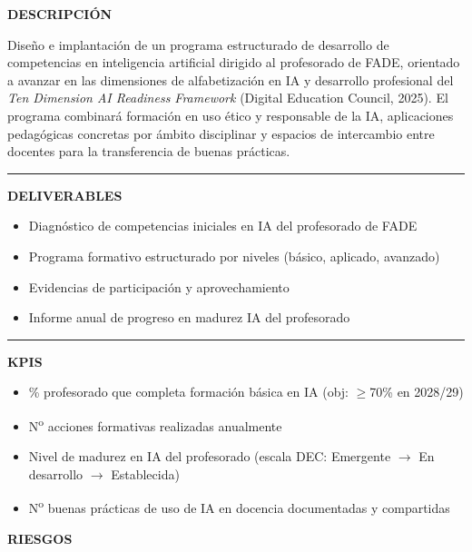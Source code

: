 \documentclass[11pt,a4paper]{scrreprt}
\newcommand{\fieldlabel}[1]{%
  {\footnotesize\sffamily\bfseries\color{mutedcolor}\MakeUppercase{#1}}\par\nopagebreak[4]
}
\newcommand{\fieldsep}{\vspace{3pt}\noindent\textcolor{bordercolor}{\rule{\linewidth}{0.4pt}}\vspace{3pt}\par}
\begin{document}
\begin{tcolorbox}[pabox={aacolor}{PA4.3 \enspace\textbullet\enspace Desarrollo de la alfabetización en IA del profesorado}]

\fieldlabel{Descripci\'on}
{\small Diseño e implantación de un programa estructurado de desarrollo de competencias en inteligencia artificial dirigido al profesorado de FADE, orientado a avanzar en las dimensiones de alfabetización en IA y desarrollo profesional del \textit{Ten Dimension AI Readiness Framework} (Digital Education Council, 2025). El programa combinará formación en uso ético y responsable de la IA, aplicaciones pedagógicas concretas por ámbito disciplinar y espacios de intercambio entre docentes para la transferencia de buenas prácticas.}\par
\fieldsep
\fieldlabel{Deliverables}
{\small \begin{itemize}[noitemsep,topsep=2pt]
\item Diagnóstico de competencias iniciales en IA del profesorado de FADE
\item Programa formativo estructurado por niveles (básico, aplicado, avanzado)
\item Evidencias de participación y aprovechamiento
\item Informe anual de progreso en madurez IA del profesorado
\end{itemize}}\par
\fieldsep
\fieldlabel{KPIs}
{\small \begin{itemize}[noitemsep,topsep=2pt]
\item \% profesorado que completa formación básica en IA (obj: $\geq$70\% en 2028/29)
\item N\textsuperscript{o} acciones formativas realizadas anualmente
\item Nivel de madurez en IA del profesorado (escala DEC: Emergente $\rightarrow$ En desarrollo $\rightarrow$ Establecida)
\item N\textsuperscript{o} buenas prácticas de uso de IA en docencia documentadas y compartidas
\end{itemize}}\par
\end{tcolorbox}
\begin{tcolorbox}[riskbox]
{\footnotesize\sffamily\bfseries\color{red!50!black} RIESGOS}\par{}
\end{tcolorbox}
\end{document}
